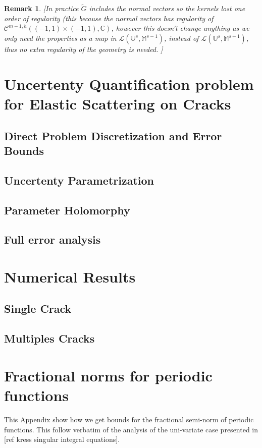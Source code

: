 \documentclass{article}
\newtheorem{remark}[theorem]{Remark}
\newcommand{\todo}[1]{{\color{red}[#1]}}
\newcommand{\IC}{{\mathbb C}}
\newcommand{\cmspaceh}[4]{\mathcal{C}^{#1,#2} \left( #3, #4 \right)}
\newcommand{\iinterv}{(-1,1)\times(-1,1)}
\begin{document}
\begin{remark}
\todo{In practice $\widetilde{G}$ includes  the normal vectors so the kernels lost one order of regularity (this because the normal vectors has regularity of $\cmspaceh{m-1}{h}{\iinterv}{\IC}$, however this doesn't change anything as we only need the properties as a map in $\mathcal{L}(\mathbb{U}^s, \mathbb{M}^{s-1})$, instead of $\mathcal{L}(\mathbb{U}^s, \mathbb{M}^{s+1})$, thus no extra regularity of the geometry is needed. }
\end{remark}

\section{Uncertenty Quantification problem for Elastic Scattering on Cracks}
\subsection{Direct Problem Discretization and Error Bounds}
\subsection{Uncertenty Parametrization}
\subsection{Parameter Holomorphy}
\subsection{Full error analysis}

\section{Numerical Results}
\subsection{Single Crack}
\subsection{Multiples Cracks}

\appendix
\section{Fractional norms for periodic functions}
\label{appendix:fracbivariate}
This Appendix show how we get bounds for the fractional semi-norm of periodic functions. This follow verbatim of the analysis of the uni-variate case presented in \todo{ref kress singular integral equations}. 
\end{document}
